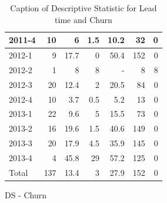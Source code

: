 \documentclass[UKenglish]{ifimaster}  %
\begin{document}
\begin{appendices}
\begin{table}[!htbp]
\begin{adjustwidth}{-1.5cm}{}
\begin{subfigure}[b]{0.7\textwidth}
{\begin{tabular}{ | l | r | r | r | r | r | r | }
 2011-4  & 10 & 6 & 1.5 & 10.2 & 32 & 0\\ \hline
 2012-1  & 9 & 17.7 & 0 &50.4 & 152 & 0\\ \hline
 2012-2  & 1 & 8 & 8 & - & 8 & 8 \\ \hline
 2012-3  & 20 & 12.4 & 2 & 20.5 & 84 & 0\\ \hline
 2012-4  & 10 & 3.7 & 0.5 & 5.2 & 13 & 0\\ \hline
 2013-1  & 22 & 9.6 & 5 & 15.5 & 73 & 0\\ \hline
 2013-2  & 16 & 19.6 & 1.5 & 40.6 & 149 & 0\\ \hline
 2013-3  & 20 & 17.9 & 4.5 & 35.9 & 145 & 0\\ \hline
 2013-4  & 4 & 45.8 & 29 & 57.2 & 125 & 0\\ \hline
 Total  & 137 & 13.4 & 3 & 27.9 & 152 & 0\\ \hline
\end{tabular}
}
\caption{DS - Churn}
 \label{DS:Churn:8}
\end{subfigure}
\end{adjustwidth}
\caption[Optional caption for list of figures]{Caption of Descriptive Statistic for Lead time and Churn}
\label{DS:8:3}
\end{table}


\end{appendices}
\end{document}
